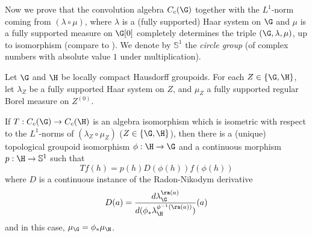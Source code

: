 Now we prove that the convolution algebra $C_c(\G)$ together with the $L^1$-norm coming from $(\lambda\circ\mu)$, where $\lambda$ is a (fully supported) Haar system on $\G$ and $\mu$ is a fully supported measure on $\G[0]$ completely determines the triple $(\G,\lambda,\mu)$, up to isomorphism (compare to \cite{MR2102633}). We denote by $\mathbb{S}^1$ the \emph{circle group} (of complex numbers with absolute value $1$ under multiplication).

\begin{theorem}\label{theoremmeasuredgroupoidconvolutionalgebra}
Let $\G$ and $\H$ be locally compact Hausdorff groupoids. For each $Z\in\left\{\G,\H\right\}$, let $\lambda_Z$ be a fully supported Haar system on $Z$, and $\mu_Z$ a fully supported regular Borel measure on $Z^{(0)}$.

If $T:C_c(\G)\to C_c(\H)$ is an algebra isomorphism which is isometric with respect to the $L^1$-norms of $(\lambda_Z\circ\mu_Z)$ ($Z\in\left\{\G,\H\right\}$), then there is a (unique) topological groupoid isomorphism $\phi:\H\to\G$ and a continuous morphism $p:\H\to\mathbb{S}^1$ such that
\[Tf(h)=p(h)D(\phi(h))f(\phi(h))\]
where $D$ is a continuous instance of the Radon-Nikodym derivative
\[D(a)=\frac{d\lambda_{\G}^{\ra(a)}}{d(\phi_*\lambda_{\H}^{\phi^{-1}(\ra(a))})}(a)\]
and in this case, $\mu_{\G}=\phi_*\mu_{\H}$.
\end{theorem}
